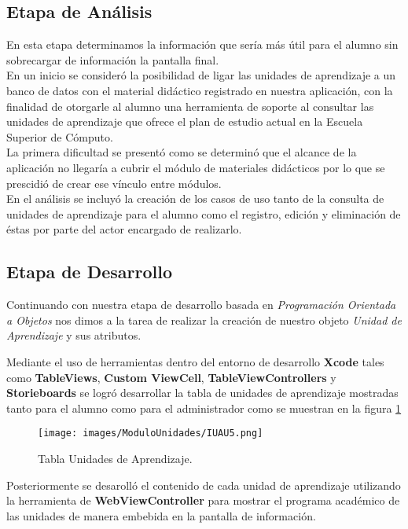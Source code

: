  \subsection{Etapa de Análisis}
 En esta etapa determinamos la información que sería más útil para el alumno sin sobrecargar de información la pantalla final. \\
 En un inicio se consideró la posibilidad de ligar las unidades de aprendizaje a un banco de datos con el material didáctico registrado en nuestra aplicación, con la finalidad de otorgarle al alumno una herramienta de soporte al consultar las unidades de aprendizaje que ofrece el plan de estudio actual en la Escuela Superior de Cómputo. \\
 La primera dificultad se presentó como se determinó que el alcance de la aplicación no llegaría a cubrir el módulo de materiales didácticos por lo que se prescidió de crear ese vínculo entre módulos. \\
 En el análisis se incluyó la creación de los casos de uso tanto de la consulta de unidades de aprendizaje para el alumno como el registro, edición y eliminación de éstas por parte del actor encargado de realizarlo.
 
 
 \subsection{Etapa de Desarrollo}
 Continuando con nuestra etapa de desarrollo basada en \textit{Programación Orientada a Objetos} nos dimos a la tarea de realizar la creación de nuestro objeto \textit{Unidad de Aprendizaje} y sus atributos.
 
 Mediante el uso de herramientas dentro del entorno de desarrollo \textbf{Xcode} tales como \textbf{TableViews}, \textbf{Custom ViewCell}, \textbf{TableViewControllers} y \textbf{Storieboards} se logró desarrollar la tabla de unidades de aprendizaje mostradas tanto para el alumno como para el administrador como se muestran en la figura \ref{unidades}
 
 \begin{figure}[h!]
 	\begin{center}
 		\texttt{[image: images/ModuloUnidades/IUAU5.png]}
 		\caption{Tabla Unidades de Aprendizaje.}
 		\label{unidades}
 	\end{center}
 \end{figure}
 
 Posteriormente se desarolló el contenido de cada unidad de aprendizaje utilizando la herramienta de \textbf{WebViewController} para mostrar el programa académico de las unidades de manera embebida en la pantalla de información. \\
 
